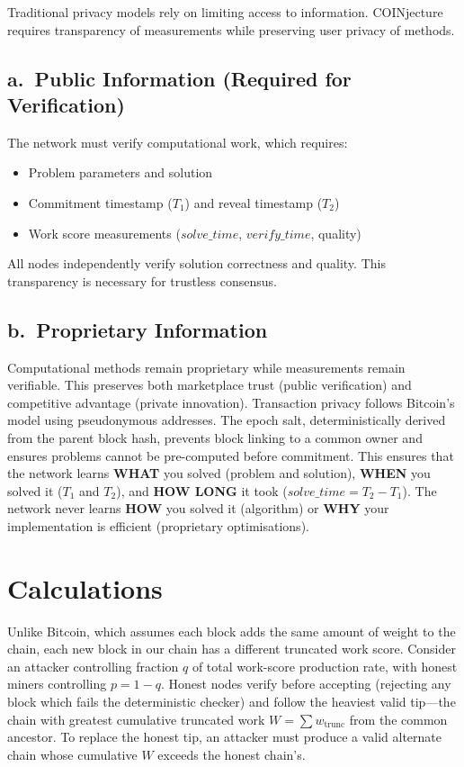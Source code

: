 \documentclass[12pt,letterpaper]{article}
\begin{document}
Traditional privacy models rely on limiting access to information. COINjecture requires transparency of
measurements while preserving user privacy of methods.

\subsection*{a.\ Public Information (Required for Verification)}

The network must verify computational work, which requires:
\begin{itemize}[leftmargin=2em,itemsep=2pt]
  \item Problem parameters and solution
  \item Commitment timestamp ($T_1$) and reveal timestamp ($T_2$)
  \item Work score measurements ($\mathit{solve\_time}$, $\mathit{verify\_time}$, quality)
\end{itemize}
All nodes independently verify solution correctness and quality. This transparency is necessary for
trustless consensus.

\subsection*{b.\ Proprietary Information}

Computational methods remain proprietary while measurements remain verifiable. This preserves both
marketplace trust (public verification) and competitive advantage (private innovation). Transaction
privacy follows Bitcoin's model using pseudonymous addresses. The epoch salt, deterministically derived
from the parent block hash, prevents block linking to a common owner and ensures problems cannot be
pre-computed before commitment. This ensures that the network learns \textbf{WHAT} you solved
(problem and solution), \textbf{WHEN} you solved it ($T_1$ and $T_2$), and \textbf{HOW LONG} it
took ($\mathit{solve\_time} = T_2 - T_1$). The network never learns \textbf{HOW} you solved it
(algorithm) or \textbf{WHY} your implementation is efficient (proprietary optimisations).

\section*{Calculations}

Unlike Bitcoin, which assumes each block adds the same amount of weight to the chain, each new block
in our chain has a different truncated work score. Consider an attacker controlling fraction $q$ of total
work-score production rate, with honest miners controlling $p = 1 - q$. Honest nodes verify before
accepting (rejecting any block which fails the deterministic checker) and follow the heaviest valid
tip---the chain with greatest cumulative truncated work $W = \sum w_{\mathrm{trunc}}$ from the common
ancestor. To replace the honest tip, an attacker must produce a valid alternate chain whose cumulative
$W$ exceeds the honest chain's.
\end{document}

